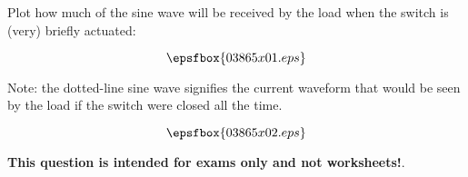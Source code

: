 

Plot how much of the sine wave will be received by the load when the switch is (very) briefly actuated:

$$\epsfbox{03865x01.eps}$$

Note: the dotted-line sine wave signifies the current waveform that would be seen by the load if the switch were closed all the time.







$$\epsfbox{03865x02.eps}$$







{\bf This question is intended for exams only and not worksheets!}.



